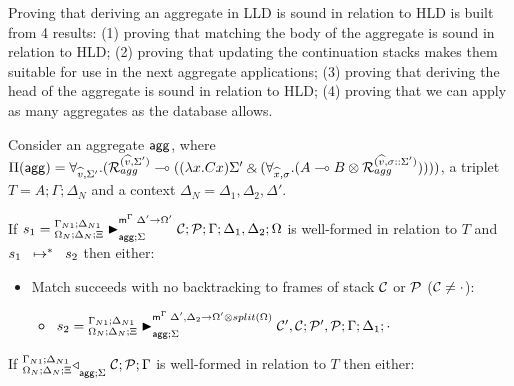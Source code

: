 
Proving that deriving an aggregate in LLD is sound in relation to HLD is
built from 4 results: (1) proving that matching the body of the aggregate is
sound in relation to HLD; (2) proving that updating the continuation stacks
makes them suitable for use in the next aggregate applications; (3) proving
that deriving the head of the aggregate is sound in relation to HLD; (4)
proving that we can apply as many aggregates as the database allows.

\begin{lemma}\label{thm:aggregate_body_match}
Consider an aggregate $\m{agg}$, where $\Pi(\m{agg}) = \forall_{\widehat{v}, \Sigma'}.
   (\defstwo{agg}{\widehat{v}}{\Sigma'} \lolli ((\lambda x. C x)\Sigma' \with (\forall_{\widehat{x}, \sigma}.
                                                (A \lolli B \otimes
                                                 \defstwo{agg}{\widehat{v}}{\sigma
                                                 ::\Sigma'}))))$,
a triplet $T = A; \Gamma; \Delta_{N}$ and a context $\Delta_{N} = \Delta_1,
  \Delta_2, \Delta'$.

  If $s_1 = \matstatea{\Delta_N}{\lstack{C};
      \lstack{P}}{\Gamma}{\Delta_1, \Delta_2}{\Omega}{\Delta' \rightarrow
         \Omega'}{\Sigma}$ is well-formed in relation to $T$ and
         $\transs{s_1}{s_2}$ then either:

\begin{itemize}[leftmargin=*]
   \item Match succeeds with no backtracking to frames of stack $\lstack{C}$
   or $\lstack{P}$ ($\lstack{C} \neq \cdot$):

   \begin{itemize}[leftmargin=\secondm]
      \item $s_2 = \matstatea{\Delta_N}{\lstack{C'}, \lstack{C}; \lstack{P'},
         \lstack{P}}{\Gamma}{\Delta_1}{\cdot}{\Delta', \Delta_2 \rightarrow \Omega' \otimes split(\Omega)}{\Sigma}$
   \end{itemize}

   

\end{itemize}

If $\contstatea{\Delta_N}{\lstack{C}; \lstack{P}}{\Gamma}{\Sigma}$ is
well-formed in relation to $T$ then either:

\begin{itemize}[leftmargin=*]
   
\end{itemize}
\end{lemma}

